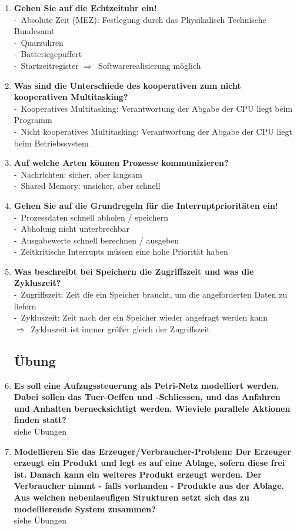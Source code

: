 \documentclass[a4paper,12pt]{article}
\newcommand{\questionnopage}[2]{\pagebreak[3]\item {\textbf{#1?}}#2}
\newcommand{\statementnopage}[2]{\pagebreak[3]\item {\textbf{#1!}}#2}
\newcommand{\catchword}[1]{\\-\ #1}
\newcommand{\normaltext}[1]{\\#1}
\newcommand{\result}[1]{\\$\Rightarrow$\ #1}
\newcommand{\resultol}[1]{$\Rightarrow$\ #1}
\begin{document}
\begin{enumerate}
{  }
  
  
 
 
  
    

  \statementnopage{Gehen Sie auf die Echtzeituhr ein}
  {
    \catchword{Absolute Zeit (MEZ): Festlegung durch das Physikalisch Technische Bundesamt}
    \catchword{Quarzuhren}
    \catchword{Batteriegepuffert}
    \catchword{Startzeitregister \resultol{Softwarerealisierung möglich}}
  }

  \questionnopage{Was sind die Unterschiede des kooperativen zum nicht kooperativen Multitasking}
  {
    \catchword{Kooperatives Multitasking: Verantwortung der Abgabe der CPU liegt beim Programm}
    \catchword{Nicht kooperatives Multitasking: Verantwortung der Abgabe der CPU liegt beim
               Betriebssystem}
  }

  \questionnopage{Auf welche Arten können Prozesse kommunizieren}
  {
    \catchword{Nachrichten: sicher, aber langsam}
    \catchword{Shared Memory: unsicher, aber schnell}
  }

  \statementnopage{Gehen Sie auf die Grundregeln für die Interruptprioritäten ein}
  {
    \catchword{Prozessdaten schnell abholen / speichern}
    \catchword{Abholung nicht unterbrechbar}
    \catchword{Ausgabewerte schnell berechnen / ausgeben}
    \catchword{Zeitkritische Interrupts müssen eine hohe Priorität haben}
  }

  \questionnopage{Was beschreibt bei Speichern die Zugriffszeit und was die Zykluszeit}
  {
    \catchword{Zugriffszeit: Zeit die ein Speicher braucht, um die angeforderten Daten zu liefern}
    \catchword{Zykluszeit: Zeit nach der ein Speicher wieder angefragt werden kann}
    \result {Zykluszeit ist immer größer gleich der Zugriffszeit}
  }

  \subsection{Übung}
  
  \questionnopage{Es soll eine Aufzugssteuerung als Petri-Netz modelliert werden.
  Dabei sollen das Tuer-Oeffen und -Schliessen, und das Anfahren und
  Anhalten beruecksichtigt werden. Wieviele parallele Aktionen
  finden statt}
  {
  \normaltext{siehe Übungen}
  }
  
  \questionnopage{Modellieren Sie das Erzeuger/Verbraucher-Problem: Der Erzeuger
  erzeugt ein Produkt und legt es auf eine Ablage, sofern diese
  frei ist. Danach kann ein weiteres Produkt erzeugt werden. Der
  Verbraucher nimmt - falls vorhanden - Produkte aus der Ablage.
  Aus welchen nebenlaeufigen Strukturen setzt sich das zu
  modellierende System zusammen}
  {
  \normaltext{siehe Übungen}
  }
  

\end{enumerate}
\end{document}
